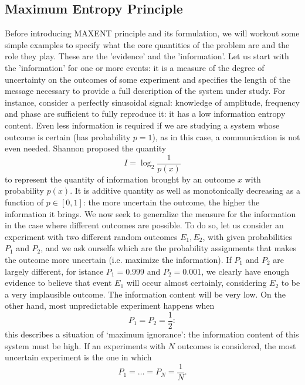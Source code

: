 \documentclass[twocolumn,showpacs,preprintnumbers,nofootinbib,prd,
superscriptaddress,10pt]{revtex4-1}
\begin{document}
\subsection{Maximum Entropy Principle} \label{sec:MAXENT}
Before introducing MAXENT principle and its formulation, we will workout some simple examples to specify what the core quantities of the problem are and the 
role they play. These are the 'evidence' and the 'information'. Let us start with the 'information' for one or more events: it is a measure of the degree of uncertainty on the outcomes of some experiment and specifies the length of the message necessary to provide a full description of the system under study. For instance, consider a perfectly sinusoidal signal: knowledge of amplitude, frequency and phase are sufficient to fully reproduce it: 
it has a low information entropy content. Even less information is required if we are studying a system whose outcome is 
certain (has probability $p = 1$), as in this case, a communication is not even needed.  
Shannon \cite{Shannon} proposed the quantity
\begin{equation}\label{eq:information}
    I = \log_2 \frac{1}{p(x)}
\end{equation}
to represent the quantity of information brought by an outcome $x$ with probability $p(x)$. It is additive quantity as well as monotonically decreasing as a function of $p \in [0, 1]$: the more uncertain the outcome, the higher the information it brings.
We now seek to generalize the measure for the information in the case where different outcomes are possible.
To do so, let us consider an experiment with two different random outcomes $E_1, E_2$, with given probabilities $P_1$ and $P_2$, and we ask ourselfs which are the probability assignments that makes the outcome more uncertain (i.e. maximize the information).
If $P_1$ and $P_2$ are largely different, for istance $P_1 = 0.999$ and $P_2 = 0.001$, we clearly have enough evidence to believe that event $E_1$ will occur almost certainly, considering $E_2$ to be a very implausible outcome. The information content will be very low.
On the other hand, most unpredictable experiment happens when 
\begin{equation}\nonumber
    P_1 = P_2 = \frac{1}{2}:
\end{equation}
this describes a situation of `maximum ignorance':  the information content of this system must be high. If an experiments with $N$ outcomes
is  considered, the most uncertain experiment is the one in which 
\begin{equation}\label{eq:indifference}
P_1 = \dots = P_N = \frac{1}{N}.
\end{equation}
\end{document}
